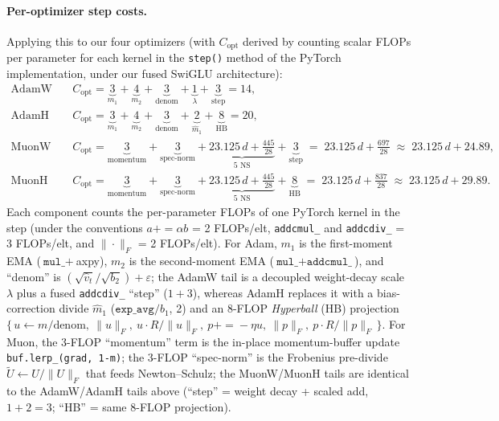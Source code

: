 \documentclass{article}
\begin{document}
\paragraph{Per-optimizer step costs.} Applying this to our four optimizers (with $C_{\text{opt}}$ derived by counting scalar FLOPs per parameter for each kernel in the \texttt{step()} method of the PyTorch implementation, under our fused SwiGLU architecture):
\begin{align*}
\text{AdamW}\quad & C_{\text{opt}} = \underbrace{3}_{m_1} + \underbrace{4}_{m_2} + \underbrace{3}_{\text{denom}} + \underbrace{1}_{\lambda} + \underbrace{3}_{\text{step}} = 14, \\
\text{AdamH}\quad & C_{\text{opt}} = \underbrace{3}_{m_1} + \underbrace{4}_{m_2} + \underbrace{3}_{\text{denom}} + \underbrace{2}_{\hat m_1} + \underbrace{8}_{\text{HB}} = 20, \\
\text{MuonW}\quad & C_{\text{opt}} = \underbrace{3}_{\text{momentum}} + \underbrace{3}_{\text{spec-norm}} + \underbrace{23.125\,d + \tfrac{445}{28}}_{\text{5 NS}} + \underbrace{3}_{\text{step}} \;=\; 23.125\,d + \tfrac{697}{28} \;\approx\; 23.125\,d + 24.89, \\
\text{MuonH}\quad & C_{\text{opt}} = \underbrace{3}_{\text{momentum}} + \underbrace{3}_{\text{spec-norm}} + \underbrace{23.125\,d + \tfrac{445}{28}}_{\text{5 NS}} + \underbrace{8}_{\text{HB}} \;=\; 23.125\,d + \tfrac{837}{28} \;\approx\; 23.125\,d + 29.89.
\end{align*}
Each component counts the per-parameter FLOPs of one PyTorch kernel in the step (under the conventions $a\mathbin{{+}{=}}\alpha b$ = 2 FLOPs/elt, \texttt{addcmul\_} and \texttt{addcdiv\_} = 3 FLOPs/elt, and $\|\cdot\|_F$ = 2 FLOPs/elt). For Adam, $m_1$ is the first-moment EMA ($\texttt{mul\_}+$axpy), $m_2$ is the second-moment EMA ($\texttt{mul\_}+\texttt{addcmul\_}$), and ``denom'' is $(\sqrt{\hat v_t}/\sqrt{b_2})+\varepsilon$; the AdamW tail is a decoupled weight-decay scale $\lambda$ plus a fused \texttt{addcdiv\_} ``step'' ($1+3$), whereas AdamH replaces it with a bias-correction divide $\hat m_1$ ($\texttt{exp\_avg}/b_1$, 2) and an 8-FLOP \emph{Hyperball} (HB) projection $\{\,u\leftarrow m/\text{denom},\ \|u\|_F,\ u\!\cdot\!R/\|u\|_F,\ p\mathrel{{+}{=}}\!-\eta u,\ \|p\|_F,\ p\!\cdot\!R/\|p\|_F\,\}$. For Muon, the 3-FLOP ``momentum'' term is the in-place momentum-buffer update \texttt{buf.lerp\_(grad,\ 1-m)}; the 3-FLOP ``spec-norm'' is the Frobenius pre-divide $\tilde U\leftarrow U/\|U\|_F$ that feeds Newton--Schulz; the MuonW/MuonH tails are identical to the AdamW/AdamH tails above (``step'' = weight decay + scaled add, $1+2=3$; ``HB'' = same 8-FLOP projection).
\end{document}
